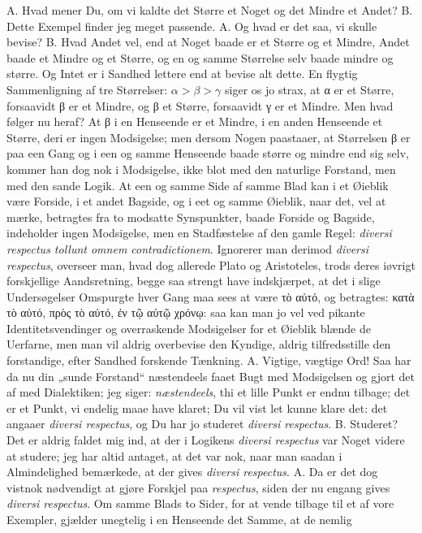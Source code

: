 \documentclass[12pt,a4paper]{book}
\begin{document}
A. Hvad mener Du, om vi kaldte det Større et Noget og det Mindre et
Andet? B. Dette Exempel finder jeg meget passende. A. Og hvad er det
saa, vi skulle bevise? B. Hvad Andet vel, end at Noget baade er et
Større og et Mindre, Andet baade et Mindre og et Større, og en og samme
Størrelse selv baade mindre og større. Og Intet er i Sandhed lettere
end at bevise alt dette. En flygtig Sammenligning af tre Størrelser:
$\alpha > \beta > \gamma$ siger os jo strax, at α er et Større,
forsaavidt β er et Mindre, og β et Større, forsaavidt γ er et Mindre.
Men hvad følger nu heraf? At β i en Henseende er et Mindre, i en anden
Henseende et Større, deri er ingen Modsigelse; men dersom Nogen
paastaaer, at Størrelsen β er paa een Gang og i een og samme Henseende
baade større og mindre end sig selv, kommer han dog nok i Modsigelse,
ikke blot med den naturlige Forstand, men med den sande Logik. At een
og samme Side af samme Blad kan i et Øieblik være Forside, i et andet
Bagside, og i eet og samme Øieblik, naar det, vel at mærke, betragtes
fra to modsatte Synspunkter, baade Forside og Bagside, indeholder ingen
Modsigelse, men en Stadfæstelse af den gamle Regel: \textit{diversi
respectus tollunt omnem contradictionem}. Ignorerer man derimod
\textit{diversi respectus}, overseer man, hvad dog allerede Plato og
Aristoteles, trods deres iøvrigt forskjellige Aandsretning, begge saa
strengt have indskjærpet, at det i slige Undersøgelser Omspurgte hver
Gang maa sees at være τὸ αὐτό, og betragtes: κατὰ τὸ αὐτό,
πρὸς τὸ αὐτό, ἐν τῷ αὐτῷ χρόνῳ: saa kan man jo vel ved pikante
Identitetsvendinger og overraskende Modsigelser for et Øieblik blænde de
Uerfarne, men man vil aldrig overbevise den Kyndige, aldrig
tilfredsstille den forstandige, efter Sandhed forskende Tænkning.
A. Vigtige, vægtige Ord! Saa har da nu din „sunde Forstand“
næstendeels faaet Bugt med Modsigelsen og gjort det af med Dialektiken;
jeg siger: \emph{næstendeels}, thi et lille Punkt er endnu tilbage; det
er et Punkt, vi endelig maae have klaret; Du vil vist let kunne klare
det: det angaaer \textit{diversi respectus}, og Du har jo studeret
\textit{diversi respectus}. B. Studeret? Det er aldrig faldet mig
ind, at der i Logikens \textit{diversi respectus} var Noget videre at
studere; jeg har altid antaget, at det var nok, naar man saadan i
Almindelighed bemærkede, at der gives \textit{diversi respectus}.
A. Da er det dog vistnok nødvendigt at gjøre Forskjel paa
\textit{respectus}, siden der nu engang gives \textit{diversi
respectus}. Om samme Blads to Sider, for at vende tilbage til et af
vore Exempler, gjælder unegtelig i en Henseende det Samme, at de nemlig
\end{document}
